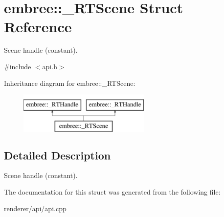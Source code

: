 \hypertarget{structembree_1_1___r_t_scene}{
\section{embree::\_\-RTScene Struct Reference}
\label{structembree_1_1___r_t_scene}
}


Scene handle (constant).  




{\ttfamily \#include $<$api.h$>$}

Inheritance diagram for embree::\_\-RTScene:\begin{figure}[H]
\begin{center}
\leavevmode
\includegraphics[height=2.000000cm]{structembree_1_1___r_t_scene}
\end{center}
\end{figure}


\subsection{Detailed Description}
Scene handle (constant). 

The documentation for this struct was generated from the following file:\begin{DoxyCompactItemize}
\item 
renderer/api/api.cpp\end{DoxyCompactItemize}
